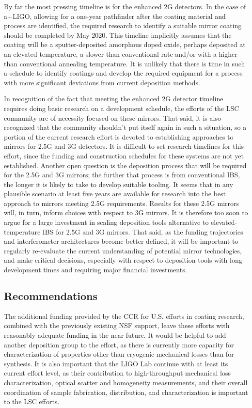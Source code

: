 By far the most pressing timeline is for the enhanced 2G detectors. In the case of a+LIGO, allowing for a one-year pathfinder after the coating material and process are identified, the required research to identify a suitable mirror coating should be completed by May 2020. This timeline implicitly assumes that the coating will be a sputter-deposited amorphous doped oxide, perhaps deposited at an elevated temperature, a slower than conventional rate and/or with a higher than conventional annealing temperature. It is unlikely that there is time in such a schedule to identify coatings and develop the required equipment for a process with more significant deviations from current deposition methods.

In recognition of the fact that meeting the enhanced 2G detector timeline requires doing basic research on a development schedule, the efforts of the LSC community are of necessity focused on these mirrors. That said, it is also recognized that the community shouldn't put itself again in such a situation, so a portion of the current research effort is devoted to establishing approaches to mirrors for 2.5G and 3G detectors. It is difficult to set research timelines for this effort, since the funding and construction schedules for these systems are not yet established. Another open question is the deposition process that will be required for the 2.5G and 3G mirrors; the further that process is from conventional IBS, the longer it is likely to take to develop suitable tooling. It seems that in any plausible scenario at least five years are available for research into the best approach to mirrors meeting 2.5G requirements. Results for these 2.5G mirrors will, in turn, inform choices with respect to 3G mirrors. It is therefore too soon to argue for a large investment in scaling deposition tools alternative to elevated-temperature IBS for 2.5G and 3G mirrors. That said, as the funding trajectories and interferometer architectures become better defined, it will be important to regularly re-evaluate the current understanding of potential mirror technologies, and make critical decisions, especially with respect to deposition tools with long development times and requiring major financial investments.

\subsection{Recommendations}

\noindent The additional funding provided by the CCR for U.S. efforts in coating research, combined with the previously existing NSF support, leave these efforts with reasonably adequate funding in the near future. It would be helpful to add another deposition group to the effort, as there is currently more capacity for characterization of properties other than cryogenic mechanical losses than for synthesis. It is also important that the LIGO Lab continue with at least its current effort level, as their contribution to high-throughput mechanical loss characterization, optical scatter and homogeneity measurements, and their overall coordination of sample fabrication, distribution, and characterization is important to the LSC efforts.


